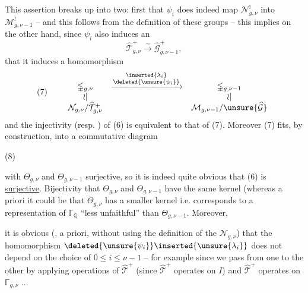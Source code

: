 This assertion breaks up into two: first  that $\psi_i$ does indeed map $\mathcal N_{g,\nu}^{!}$ into $\mathcal M_{g,\nu-1}^{!}$ -- and this follows from the  definition of these groups -- this implies on the other hand, since $\psi_i$ also induces an  
\[
\widehat{\mathcal T}_{g,\nu}^{+}
\xrightarrow{\sim}
\widehat{\mathcal G}_{g,\nu-1}^{+},
\]
that it induces a homomorphism
\[
(7)\qquad
\begin{array}{ccc}
\mathbb{\Gamma}_{g,\nu}
&\xrightarrow{\substack{\inserted{\lambda_i}\\\deleted{\unsure{\psi_i}}}}&
\mathbb{\Gamma}_{g,\nu-1}\\
\wr\vert&&\wr\vert\\
\mathcal N_{g,\nu}/\widehat{\mathcal T}_{g,\nu}^{+}
&&\mathcal M_{g,\nu-1}/\unsure{\widehat{\mathcal G}}
\end{array}
\]
and the injectivity (resp. ) of (6) is equivalent to that of (7). Moreover (7) fits, by construction, into a commutative diagram

(8)\quad{}

with $\Theta_{g,\nu}$ and $\Theta_{g,\nu-1}$ surjective, so it is indeed quite obvious that (6) is \uline{surjective}. Bijectivity  that $\Theta_{g,\nu}$ and $\Theta_{g,\nu-1}$ have the same kernel (whereas a priori it could be that $\Theta_{g,\nu}$ has a smaller kernel i.e. corresponds to a representation of $\mathbb{\Gamma}_{\mathbb Q}$ ``less unfaithful'' than $\Theta_{g,\nu-1}$. Moreover,


it is obvious  (, a priori, without using the definition   of the $\mathcal N_{g,\nu}$) that the homomorphism $\deleted{\unsure{\psi_i}}\inserted{\unsure{\lambda_i}}$  does not depend on the choice of $0\leq i\leq\nu-1$ -- for example since we pass from one to the other by applying operations of $\widehat{\mathcal T}^{+}$ (since $\widehat{\mathcal T}^{+}$ operates  on $I$) and $\widehat{\mathcal T}^{+}$ operates  on $\mathbb{\Gamma}_{g,\nu}$ ...


